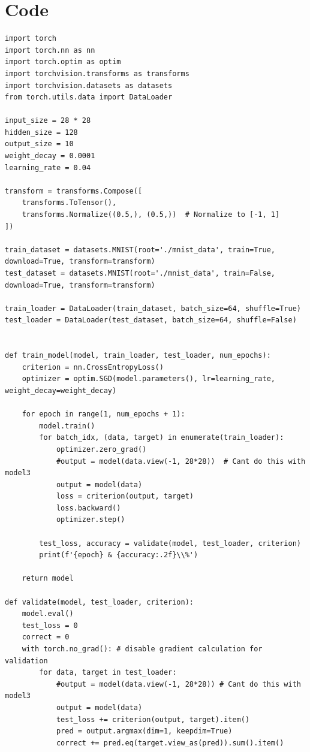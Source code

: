 \documentclass[a4paper]{article}
\begin{document}
\printbibliography
\appendix

\section*{Code}
\label{app:excode}

\begin{lstlisting}
import torch
import torch.nn as nn
import torch.optim as optim
import torchvision.transforms as transforms
import torchvision.datasets as datasets
from torch.utils.data import DataLoader

input_size = 28 * 28
hidden_size = 128
output_size = 10
weight_decay = 0.0001
learning_rate = 0.04

transform = transforms.Compose([
    transforms.ToTensor(),
    transforms.Normalize((0.5,), (0.5,))  # Normalize to [-1, 1]
])

train_dataset = datasets.MNIST(root='./mnist_data', train=True, download=True, transform=transform)
test_dataset = datasets.MNIST(root='./mnist_data', train=False, download=True, transform=transform)

train_loader = DataLoader(train_dataset, batch_size=64, shuffle=True)
test_loader = DataLoader(test_dataset, batch_size=64, shuffle=False)


def train_model(model, train_loader, test_loader, num_epochs):
    criterion = nn.CrossEntropyLoss()
    optimizer = optim.SGD(model.parameters(), lr=learning_rate, weight_decay=weight_decay)

    for epoch in range(1, num_epochs + 1):
        model.train()
        for batch_idx, (data, target) in enumerate(train_loader):
            optimizer.zero_grad()
            #output = model(data.view(-1, 28*28))  # Cant do this with model3
            output = model(data)
            loss = criterion(output, target)
            loss.backward()
            optimizer.step()
        
        test_loss, accuracy = validate(model, test_loader, criterion)
        print(f'{epoch} & {accuracy:.2f}\\%')
    
    return model

def validate(model, test_loader, criterion):
    model.eval()
    test_loss = 0
    correct = 0
    with torch.no_grad(): # disable gradient calculation for validation
        for data, target in test_loader:
            #output = model(data.view(-1, 28*28)) # Cant do this with model3
            output = model(data)
            test_loss += criterion(output, target).item()
            pred = output.argmax(dim=1, keepdim=True) 
            correct += pred.eq(target.view_as(pred)).sum().item()


\end{lstlisting}
\end{document}
